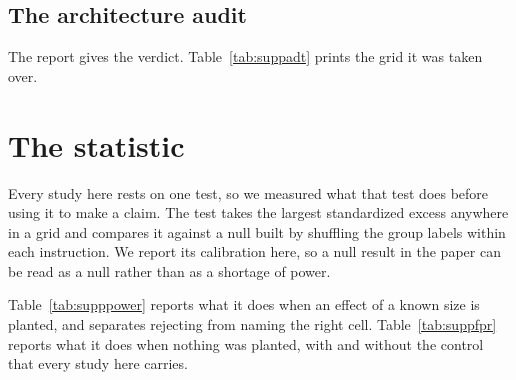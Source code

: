 \documentclass[11pt,letterpaper]{article}
\begin{document}


\subsection{The architecture audit}

The report gives the verdict. Table~\ref{tab:suppadt} prints the grid it was
taken over.



\section{The statistic}
\label{app:calibration}

Every study here rests on one test, so we measured what that test does before
using it to make a claim. The test takes the largest standardized excess
anywhere in a grid and compares it against a null built by shuffling the group
labels within each instruction. We report its calibration here, so a null
result in the paper can be read as a null rather than as a shortage of power.

Table~\ref{tab:supppower} reports what it does when an effect of a known size
is planted, and separates rejecting from naming the right cell.
Table~\ref{tab:suppfpr} reports what it does when nothing was planted, with and
without the control that every study here carries.




\end{document}
